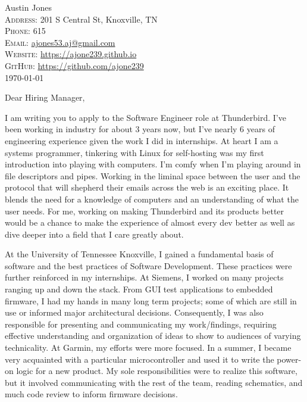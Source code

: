 \documentclass[a4paper,12pt]{article}
\newcommand{\position}{Software Engineer}
\newcommand{\company}{Thunderbird}
\begin{document}
\pagestyle{empty} %


\Huge Austin Jones\smallskip{} \\
\small \textsc{Address:} 201 S Central St, Knoxville, TN \\
\small \textsc{Phone:} 615 \\
\textsc{Email:} \href{mailto:ajones53.aj@gmail.com}{ajones53.aj@gmail.com} \\
\textsc{Website:} \href{https://ajone239.github.io}{https://ajone239.github.io} \\
\textsc{GitHub:} \href{https://github.com/ajone239}{https://github.com/ajone239} \\

\today

Dear Hiring Manager,

I am writing you to apply to the \position{} role at \company{}.
I've been working in industry for about 3 years now, but I've nearly 6 years of engineering experience given the work I did in internships.
At heart I am a systems programmer, tinkering with Linux for self-hosting was my first introduction into playing with computers.
I'm comfy when I'm playing around in file descriptors and pipes.
Working in the liminal space between the user and the protocol that will shepherd their emails across the web is an exciting place.
It blends the need for a knowledge of computers and an understanding of what the user needs.
For me, working on making \company{} and its products better would be a chance to make the experience of almost every dev better as well as dive deeper into a field that I care greatly about.

At the University of Tennessee Knoxville, I gained a fundamental basis of software and the best practices of Software Development.
These practices were further reinforced in my internships.
At Siemens, I worked on many projects ranging up and down the stack.
From GUI test applications to embedded firmware, I had my hands in many long term projects; some of which are still in use or informed major architectural decisions.
Consequently, I was also responsible for presenting and communicating my work/findings, requiring effective understanding and organization of ideas to show to audiences of varying technicality.
At Garmin, my efforts were more focused.
In a summer, I became very acquainted with a particular microcontroller and used it to write the power-on logic for a new product.
My sole responsibilities were to realize this software, but it involved communicating with the rest of the team, reading schematics, and much code review to inform firmware decisions.
\end{document}
